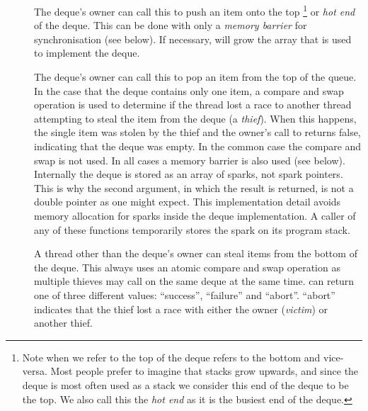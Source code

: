 \begin{description}

    \item[]
    The deque's owner can call this to push an item onto the
    top%
\footnote{
        Note when we refer to the top of the deque
        \citet{Chase_2005_wsdeque} refers to the bottom and vice-versa.
        Most people prefer to imagine that stacks grow upwards,
        and since the deque is most often used as a stack we consider this
        end of the deque to be the top.
        We also call this the \emph{hot end} as it is the busiest end of the
        deque.}
    or \emph{hot end} of the deque.
    This can be done with only a \emph{memory barrier} for synchronisation
    (see below).
    If necessary,
    \push will grow the array that is used to implement the
    deque.

    \item[]
    The deque's owner can call this to pop an item from the top of the
    queue.
    In the case that the deque contains only one item,
    a compare and swap
    operation is used to determine if the thread lost a race to another
    thread attempting to steal the item from the deque (a \emph{thief}).
    When this happens, the single item was stolen by the thief and the
    owner's call to \pop returns false,
    indicating that the deque was empty.
    In the common case the compare and swap is not used.
    In all cases a memory barrier is also used (see below).
    Internally the deque is stored as an array of sparks, not spark
    pointers.
    This is why the second argument, in which the result is returned,
    is not a double pointer as one might expect.
    This implementation detail avoids memory allocation for sparks inside
    the deque implementation.
    A caller of any of these functions temporarily stores the spark on
    its program stack.

    \item[]
    A thread other than the deque's owner can steal
    items from the bottom of the deque.
    This always uses an atomic compare and swap operation as multiple
    thieves may call \steal on the same deque at the same time.
    \steal can return one of three different values:
    ``success'', ``failure'' and ``abort''.
    ``abort'' indicates that the thief lost a race with either the owner
    (\emph{victim}) or another thief.

\end{description}

